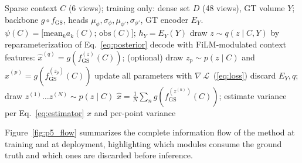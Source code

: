 \begin{algorithm}[t]
\caption{GT-Conditioned CVAE Training and Inference}
\label{alg:p5}
\begin{algorithmic}[1]
\REQUIRE Sparse context $C$ (6 views); training only: dense set $D$ (48
views), GT volume $Y$; backbone $g\circ f_{\mathrm{GS}}$, heads
$\mu_\phi,\sigma_\phi,\mu_{\phi'},\sigma_{\phi'}$, GT encoder $E_Y$.
\STATE \quad $\psi(C)=\big[\mathrm{mean}_k a_k(C);\,\mathrm{obs}(C)\big]$;\;
$h_Y = E_Y(Y)$
\STATE \quad draw $z\sim q(z\mid C,Y)$ by reparameterization of
Eq.~\eqref{eq:posterior}
\STATE \quad decode with FiLM-modulated context features:
$\hat{x}^{(q)}=g(f_{\mathrm{GS}}^{(z)}(C))$;
\STATE \quad (optional) draw $z_p\sim p(z\mid C)$ and
$\hat{x}^{(p)}=g(f_{\mathrm{GS}}^{(z_p)}(C))$
\STATE \quad update all parameters with
$\nabla\,\mathcal{L}$~(\ref{eq:loss})
\STATE \quad discard $E_Y,q$; draw $z^{(1)}\dots z^{(N)}\sim p(z\mid C)$
\STATE \quad $\hat{x}=\tfrac1N\sum_n g(f_{\mathrm{GS}}^{(z^{(n)})}(C))$;
estimate variance per Eq.~\eqref{eq:estimator}
\RETURN $\hat{x}$ and per-point variance
\end{algorithmic}
\end{algorithm}

Figure~\ref{fig:p5_flow} summarizes the complete information flow of the
method at training and at deployment, highlighting which modules
consume the ground truth and which ones are discarded before inference.

